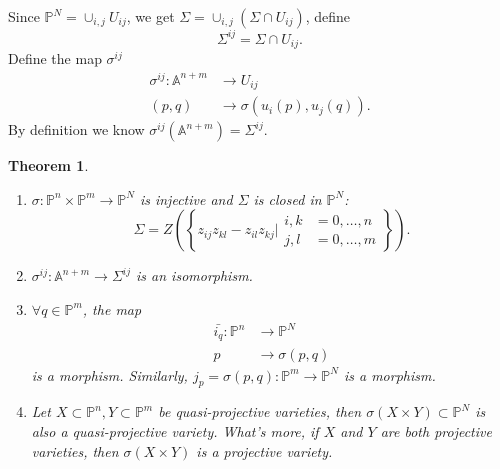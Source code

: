 \documentclass{amsart}
\theoremstyle{plain}
\newtheorem{theorem}{Theorem}
\theoremstyle{definition}
\theoremstyle{remark}
\numberwithin{equation}{section}
\begin{document}
Since $ \mathbb{P}^N=\mathop{\cup}_{i,j}U_{ij} $, we get $ \Sigma = \mathop{\cup}_{i,j}(\Sigma \cap U_{ij}) $, define
$$
\Sigma^{ij}=\Sigma \cap U_{ij}.
$$
Define the map $ \sigma^{ij} $
$$\begin{array}{cc}
\sigma^{ij}:\mathbb{A}^{n+m} & \to U_{ij}\\
(p,q) & \to \sigma (u_i(p),u_j(q)).
\end{array}$$
By definition we know $ \sigma^{ij}(\mathbb{A}^{n+m})=\Sigma^{ij} $.
\begin{theorem}
	\begin{enumerate}
		\item $ \sigma:\mathbb{P}^n\times\mathbb{P}^m\to \mathbb{P}^N $ is injective and $ \Sigma $ is closed in $ \mathbb{P}^N $:
		\begin{equation}\label{17}
		\Sigma=Z\left(\left\lbrace z_{ij}z_{kl}-z_{il}z_{kj}|\begin{matrix}
		i,k & =0,\dots,n\\
		j,l & =0,\dots,m
		\end{matrix} \right\rbrace\right).
		\end{equation}
		\item $ \sigma^{ij}:\mathbb{A}^{n+m}\to \Sigma^{ij} $ is an isomorphism.
		\item $ \forall q\in\mathbb{P}^m $, the map
		$$\begin{array}{cc}
		\bar{i_q}:  \mathbb{P}^n & \to \mathbb{P}^N\\
		p & \to \sigma(p,q)
		\end{array}$$
		is a morphism. Similarly, $ j_p=\sigma(p,q):\mathbb{P}^m\to \mathbb{P}^N $ is a morphism.
		\item Let $ X\subset \mathbb{P}^n,Y\subset \mathbb{P}^m $ be quasi-projective varieties, then $ \sigma(X\times Y)\subset \mathbb{P}^N $ is also a quasi-projective variety. What's more, if $ X $ and $ Y $ are both projective varieties, then $ \sigma(X\times Y) $ is a projective variety.
	\end{enumerate}
\end{theorem}
\end{document}
